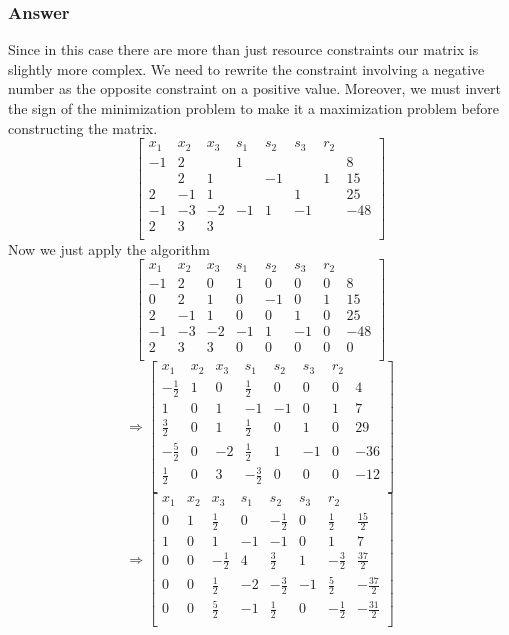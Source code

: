 \documentclass[12pt]{article}
\begin{document}
\subsubsection{Answer}
Since in this case there are more than just resource constraints our matrix is slightly more complex. We need to rewrite the constraint involving a negative number as the opposite constraint on a positive value. Moreover, we must invert the sign of the minimization problem to make it a maximization problem before constructing the matrix.
\[
\left[ \begin{array} {lll|lll|l|l}
x_1 & x_2 & x_3 &s_1 & s_2 &s_3 &r_2&\\
\hline
-1&2&&1&&&&8\\
&2&1&&-1&&1&15\\
2&-1&1&&&1&&25\\
\hline
-1&-3&-2&-1&1&-1&&-48\\
2 & 3 & 3 &&&&&\\
\end{array}\right]
\]
Now we just apply the algorithm
\[
\left[ \begin{array} {lll|lll|l|l}
x_1 & x_2 & x_3 &s_1 & s_2 &s_3 &r_2&\\
\hline
-1&2&0&1&0&0&0&8\\
0&2&1&0&-1&0&1&15\\
2&-1&1&0&0&1&0&25\\
\hline
-1&-3&-2&-1&1&-1&0&-48\\
2 & 3 & 3 &0&0&0&0&0\\
\end{array}\right]
\]
\[
\Rightarrow
\left[ \begin{array} {lll|lll|l|l}
x_1 & x_2 & x_3 &s_1 & s_2 &s_3 &r_2&\\
\hline
-\frac{1}{2}&1&0&\frac{1}{2}&0&0&0&4\\
1&0&1&-1&-1&0&1&7\\
\frac{3}{2}&0&1&\frac{1}{2}&0&1&0&29\\
\hline
-\frac{5}{2}&0&-2&\frac{1}{2}&1&-1&0&-36\\
\frac{1}{2} & 0 & 3 &-\frac{3}{2}&0&0&0&-12\\
\end{array}\right]
\]
\[
\Rightarrow
\left[ \begin{array} {lll|lll|l|l}
x_1 & x_2 & x_3 &s_1 & s_2 &s_3 &r_2&\\
\hline
0&1&\frac{1}{2}&0&-\frac{1}{2}&0&\frac{1}{2}&\frac{15}{2}\\
1&0&1&-1&-1&0&1&7\\
0&0&-\frac{1}{2}&4&\frac{3}{2}&1&-\frac{3}{2}&\frac{37}{2}\\
\hline
0&0&\frac{1}{2}&-2&-\frac{3}{2}&-1&\frac{5}{2}&-\frac{37}{2}\\
0 & 0 & \frac{5}{2} &-1&\frac{1}{2}&0&-\frac{1}{2}&-\frac{31}{2}\\
\end{array}\right]
\]
\end{document}
